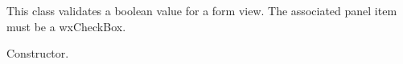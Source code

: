 \section{}\label{wxboolformvalidator}


This class validates a boolean value for a form view. The associated panel item must be a wxCheckBox.



Constructor.

